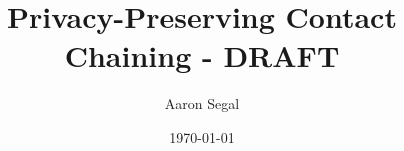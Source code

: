 {\title{Privacy-Preserving Contact Chaining - DRAFT}

\author{
 Aaron Segal
}

}
\date{\today}

\maketitle